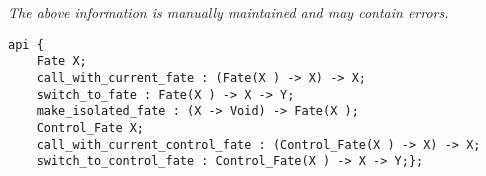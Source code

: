 \label{api:Fate}

{\tiny \it The above information is manually maintained and may contain errors.}
\begin{verbatim}
api {
    Fate X;
    call_with_current_fate : (Fate(X ) -> X) -> X;
    switch_to_fate : Fate(X ) -> X -> Y;
    make_isolated_fate : (X -> Void) -> Fate(X );
    Control_Fate X;
    call_with_current_control_fate : (Control_Fate(X ) -> X) -> X;
    switch_to_control_fate : Control_Fate(X ) -> X -> Y;};
\end{verbatim}
